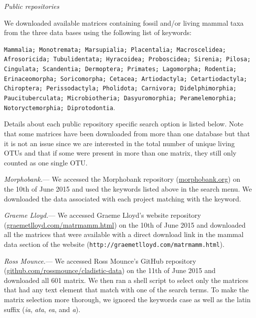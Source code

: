 \documentclass[12pt,letterpaper]{article}
\renewcommand{\subsection}[1]{%
\bigskip
\begin{center}
\begin{large}
\normalfont\itshape #1
\end{large}
\end{center}}
\renewcommand{\subsubsection}[1]{%
\vspace{2ex}
\noindent
\textit{#1.}---}
\begin{document}
\subsection{Public repositories}
We downloaded available matrices containing fossil and/or living mammal taxa from the three data bases using the following list of keywords:

\texttt{Mammalia; Monotremata; Marsupialia; Placentalia; Macroscelidea; Afrosoricida; Tubulidentata; Hyracoidea; Proboscidea; Sirenia; Pilosa; Cingulata; Scandentia; Dermoptera; Primates; Lagomorpha; Rodentia; Erinaceomorpha; Soricomorpha; Cetacea; Artiodactyla; Cetartiodactyla; Chiroptera; Perissodactyla; Pholidota; Carnivora; Didelphimorphia; Paucituberculata; Microbiotheria; Dasyuromorphia; Peramelemorphia; Notoryctemorphia; Diprotodontia}.

Details about each public repository specific search option is listed below.
Note that some matrices have been downloaded from more than one database but that it is not an issue since we are interested in the total number of unique living OTUs and that if some were present in more than one matrix, they still only counted as one single OTU.

\subsubsection{Morphobank}
We accessed the Morphobank repository (\url{morphobank.org}) on the 10th of June 2015 and used the keywords listed above in the search menu.
We downloaded the data associated with each project matching with the keyword.

\subsubsection{Graeme Lloyd}
We accessed Graeme Lloyd's website repository (\url{graemetlloyd.com/matrmamm.html}) on the 10th of June 2015 and downloaded all the matrices that were available with a direct download link in the mammal data section of the website (\texttt{http://graemetlloyd.com/matrmamm.html}).

\subsubsection{Ross Mounce}
We accessed Ross Mounce's GitHub repository (\url{github.com/rossmounce/cladistic-data}) on the 11th of June 2015 and downloaded all 601 matrix.
We then ran a shell script to select only the matrices that had any text element that match with one of the search terms.
To make the matrix selection more thorough, we ignored the keywords case as well as the latin suffix (\textit{ia}, \textit{ata}, \textit{ea}, and \textit{a}).
\end{document}
